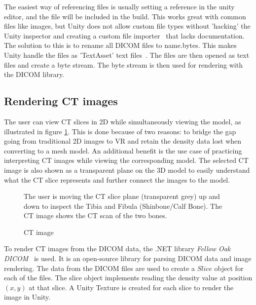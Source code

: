 \documentclass[a4paper]{report}
\begin{document}
The easiest way of referencing files is usually setting a reference in the unity editor, and the file will be included in the build. This works great with common files like images, but Unity does not allow custom file types without 'hacking' the Unity inspector and creating a custom file importer~\cite{scriptedimporters_unity_nodate} that lacks documentation. The solution to this is to rename all DICOM files to {name}.bytes. This makes Unity handle the files as 'TextAsset' text files~\cite{textassets_unity_nodate}. The files are then opened as text files and create a byte stream. The byte stream is then used for rendering with the DICOM library.

\subsection{Rendering CT images}

The user can view CT slices in 2D while simultaneously viewing the model, as illustrated in figure \ref{ctscan}. This is done because of two reasons: to bridge the gap going from traditional 2D images to VR and retain the density data lost when converting to a mesh model.
An additional benefit is the use case of practicing interpreting CT images while viewing the corresponding model. The selected CT image is also shown as a transparent plane on the 3D model to easily understand what the CT slice represents and further connect the images to the model.

\begin{figure}[h!]
    \centering
	\hfill
	\caption{CT image}\label{ctscan}
  \small
 The user is moving the CT slice plane (transparent grey) up and down to inspect the Tibia and Fibula (Shinbone/Calf Bone). The CT image shows the CT scan of the two bones.
~~\cite{mishra_virtual_2019}
\end{figure}

To render CT images from the DICOM data, the .NET library \emph{Fellow Oak DICOM}~\cite{noauthor_fellow_2022} is used. It is an open-source library for parsing DICOM data and image rendering.
The data from the DICOM files are used to create a $Slice$ object for each of the files. The slice object implements reading the density value at position $(x, y)$ at that slice. A Unity Texture is created for each slice to render the image in Unity.
\end{document}
